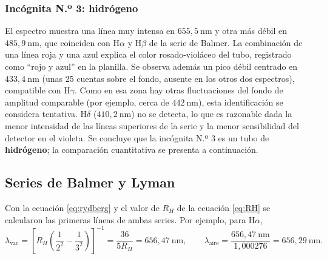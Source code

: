 \documentclass{article}
\newcommand{\nm}{\ \mathrm{nm}}
\begin{document}
\subsubsection{Incógnita N.º 3: hidrógeno}

El espectro muestra una línea muy intensa en $655,5\nm$ y otra más débil en $485,9\nm$, que coinciden con H$\alpha$ y H$\beta$ de la serie de Balmer. La combinación de una línea roja y una azul explica el color rosado-violáceo del tubo, registrado como ``rojo y azul'' en la planilla. Se observa además un pico débil centrado en $433,4\nm$ (unas 25 cuentas sobre el fondo, ausente en los otros dos espectros), compatible con H$\gamma$. Como en esa zona hay otras fluctuaciones del fondo de amplitud comparable (por ejemplo, cerca de $442\nm$), esta identificación se considera tentativa. H$\delta$ ($410,2\nm$) no se detecta, lo que es razonable dada la menor intensidad de las líneas superiores de la serie y la menor sensibilidad del detector en el violeta. Se concluye que la incógnita N.º 3 es un tubo de \textbf{hidrógeno}; la comparación cuantitativa se presenta a continuación.

\subsection{Series de Balmer y Lyman}

Con la ecuación \eqref{eq:rydberg} y el valor de $R_H$ de la ecuación \eqref{eq:RH} se calcularon las primeras líneas de ambas series. Por ejemplo, para H$\alpha$,
\begin{equation*}
    \lambda_{\mathrm{vac}}=\left[R_H\left(\frac{1}{2^2}-\frac{1}{3^2}\right)\right]^{-1}=\frac{36}{5R_H}=656,47\nm,
    \qquad
    \lambda_{\mathrm{aire}}=\frac{656,47\nm}{1,000276}=656,29\nm.
\end{equation*}
\end{document}
